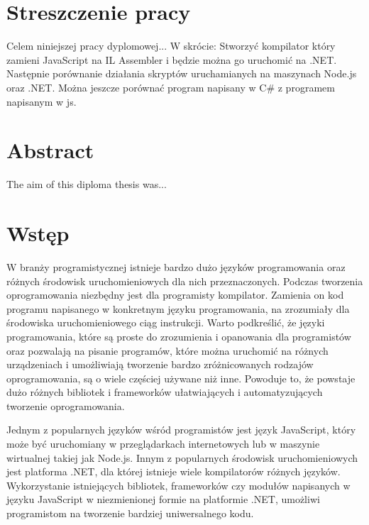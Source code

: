 \documentclass[a4paper]{article}
\begin{document}
\section*{Streszczenie pracy}
%
Celem niniejszej pracy dyplomowej...
W skrócie: Stworzyć kompilator który zamieni JavaScript na IL Assembler i będzie można go uruchomić na .NET. Następnie porównanie działania skryptów uruchamianych na maszynach Node.js oraz .NET. Można jeszcze porównać program napisany w C\# z programem napisanym w js.

\hspace{0pt}
\vfill

\section*{Abstract}
%
The aim of this diploma thesis was...
\vfill
\hspace{0pt}

\newpage
\tableofcontents
\newpage


\section{Wstęp}

\par W branży programistycznej istnieje bardzo dużo języków programowania oraz różnych środowisk uruchomieniowych dla nich przeznaczonych. Podczas tworzenia oprogramowania niezbędny jest dla programisty kompilator. Zamienia on kod programu napisanego w konkretnym języku programowania, na zrozumiały dla środowiska uruchomieniowego ciąg instrukcji. Warto podkreślić, że języki programowania, które są proste do zrozumienia i opanowania dla programistów oraz pozwalają na pisanie programów, które można uruchomić na różnych urządzeniach i umożliwiają tworzenie bardzo zróżnicowanych rodzajów oprogramowania, są o wiele częściej używane niż inne. Powoduje to, że powstaje dużo różnych bibliotek i frameworków ułatwiających i automatyzujących tworzenie oprogramowania.

\par Jednym z popularnych języków wśród programistów jest język JavaScript, który może być uruchomiany w przeglądarkach internetowych lub w maszynie wirtualnej takiej jak Node.js. Innym z popularnych środowisk uruchomieniowych jest platforma .NET, dla której istnieje wiele kompilatorów różnych języków. Wykorzystanie istniejących bibliotek, frameworków czy modułów napisanych w języku JavaScript w niezmienionej formie na platformie .NET, umożliwi programistom na tworzenie bardziej uniwersalnego kodu.
\end{document}
